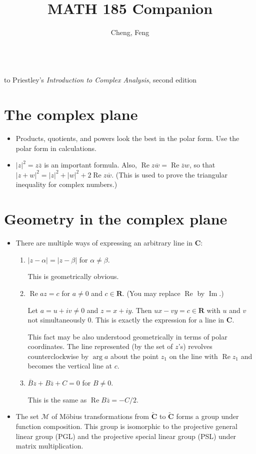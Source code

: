 \documentclass[11pt]{article}
\title{MATH 185 Companion}
\author{Cheng, Feng}
\newcommand{\R}{\mathbf{R}}
\newcommand{\C}{\mathbf{C}}
\renewcommand{\Re}{\operatorname{Re}}
\renewcommand{\Im}{\operatorname{Im}}
\newcommand{\conj}[1]{\overline{#1}}
\newcommand{\abs}[1]{\lvert #1 \rvert}
\begin{document}
\makeatletter
\begin{center}
    {\Large \@title}
    \\ to Priestley's \textit{Introduction to Complex Analysis}, second edition
    \vspace{0.5em}
    \\ \@author
    \vspace{-0.5em}
\end{center}
\makeatother

\section{The complex plane}
\begin{itemize}
    \item Products, quotients, and powers look the best in the polar form. Use the polar form in calculations.
    \item $\abs{z}^2 = z\conj{z}$ is an important formula. Also, $\Re z\conj{w} = \Re \conj{z} w$, so that $\abs{z+w}^2 = \abs{z}^2 + \abs{w}^2 + 2 \Re z\conj{w}$. (This is used to prove the triangular inequality for complex numbers.)
\end{itemize}

\section{Geometry in the complex plane}
\begin{itemize}
    \item There are multiple ways of expressing an arbitrary line in $\C$:
    \begin{enumerate}[label=\alph*)]
        \item $\abs{z - \alpha} = \abs{z - \beta}$ for $\alpha \neq \beta$.
        
        This is geometrically obvious.
        \item $\Re az = c$ for $a \neq 0$ and $c \in \R$. (You may replace $\Re$ by $\Im$.)
        
        Let $a = u + iv \neq 0$ and $z = x + iy$. Then $ux - vy = c \in \R$ with $u$ and $v$ not simultaneously 0. This is exactly the expression for a line in $\C$.
        
        This fact may be also understood geometrically in terms of polar coordinates. The line represented (by the set of $z$'s) revolves counterclockwise by $\arg a$ about the point $z_1$ on the line with $\Re z_1$ and becomes the vertical line at $c$.
        \item $\conj{B}z + B \conj{z} + C = 0$ for $B \neq 0$.
        
        This is the same as $ \Re B\conj{z} = -C/2$.
    \end{enumerate}
    \item The set $\mathcal{M}$ of Möbius transformations from $\widetilde{\C}$ to $\widetilde{\C}$ forms a group under function composition. This group is isomorphic to the projective general linear group (PGL) and the projective special linear group (PSL) under matrix multiplication.
\end{itemize}
\end{document}
